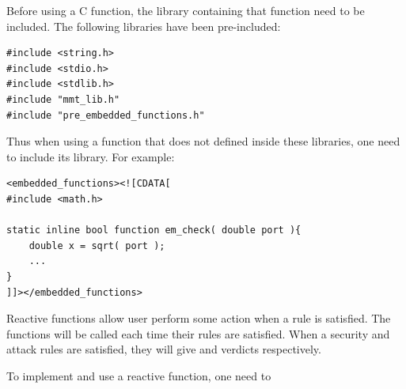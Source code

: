 \begin{enumerate}
    
    \note Before using a C function, the library containing that function need to be included.
    The following libraries have been pre-included:

    \begin{lstlisting}[style=Cpp]
#include <string.h>
#include <stdio.h>
#include <stdlib.h>
#include "mmt_lib.h"
#include "pre_embedded_functions.h"
    \end{lstlisting}
    
    Thus when using a function that does not defined inside these libraries, one need to include its library. For example:
\begin{lstlisting}[style=Cpp]
<embedded_functions><![CDATA[
#include <math.h>

static inline bool function em_check( double port ){
    double x = sqrt( port );
    ...
}
]]></embedded_functions>
\end{lstlisting}

\end{enumerate}

\label{reactive_functions}
Reactive functions allow user perform some action when a rule is satisfied.
The functions will be called each time their rules are satisfied. 
When a security and attack rules are satisfied, they will give  and  verdicts respectively.

To implement and use a reactive function, one need to

